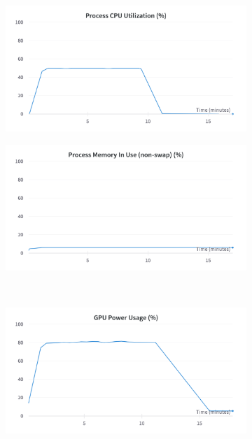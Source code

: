 \begin{figure}[]
	\centering
	\begin{subfigure}{0.43\textwidth}
		\centering
		\includegraphics[width=\textwidth]{chapters/3_models/imgs/gab/train/gabrielcputilization.png}
	\end{subfigure}
	\begin{subfigure}{0.43\textwidth}
		\centering
		\includegraphics[width=\textwidth]{chapters/3_models/imgs/gab/train/gabrielprocessmemory.png}
	\end{subfigure}\\
	\begin{subfigure}{0.43\textwidth}
		\centering
		\includegraphics[width=\textwidth]{chapters/3_models/imgs/gab/train/gabrielgpupowerusageperc.png}

\end{subfigure}
\end{figure}
